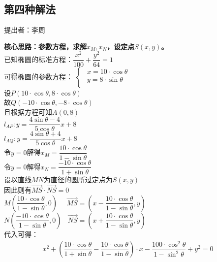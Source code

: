 \documentclass[UTF8]{ctexart}
\begin{document}
\subsection{第四种解法}
    \begin{center}
        提出者：李周
    \end{center}
    \begin{multicols}{2}
        \small
        \textbf{核心思路：参数方程，求解$x_M,x_N$，设定点$S(x,y)$。}\\[4mm]
        已知椭圆的标准方程：$\dfrac{x^2}{100}+\dfrac{y^2}{64}=1$\\[5mm]
        可得椭圆的参数方程：
        \begin{math}
            \begin{cases}
                ~~x=10\cdot\cos{\theta}\\[1mm]
                ~~y=8\cdot\sin{\theta}\\[1mm]
            \end{cases}
        \end{math}\\[5mm]
        设$P(10\cdot\cos{\theta},8\cdot\cos{\theta})$\\[5mm]
        故$Q(-10\cdot\cos{\theta},-8\cdot\cos{\theta})$\\[5mm]
        且根据方程可知$A(0,8)$\\[5mm]
        $l_{AP}:y=\dfrac{4\sin{\theta}-4}{5\cos{\theta}}x+8$\\[5mm]
        $l_{AQ}:y=\dfrac{4\sin{\theta}+4}{5\cos{\theta}}x+8$\\[5mm]
        令$y=0$解得$x_M=\dfrac{10\cdot\cos{\theta}}{1-\sin{\theta}}$\\[5mm]
        令$y=0$解得$x_N=\dfrac{-10\cdot\cos{\theta}}{1+\sin{\theta}}$\\[10mm]
        设以直线$MN$为直径的圆所过定点为$S(x,y)$\\[3mm]
        因此则有$\overrightarrow{MS}\cdot\overrightarrow{NS}=0$\\[5mm]
        $M\left(\dfrac{10\cdot\cos{\theta}}{1-\sin{\theta}},0\right)~~~~~~\overrightarrow{MS}=\left(x-\dfrac{10\cdot\cos{\theta}}{1-\sin{\theta}},y\right)$\\[5mm]
        $N\left(\dfrac{-10\cdot\cos{\theta}}{1-\sin{\theta}},0\right)~~~~\overrightarrow{NS}=\left(x+\dfrac{10\cdot\cos{\theta}}{1-\sin{\theta}},y\right)$\\[60mm]
        代入可得：
        \begin{align*}
            x^2+\left(\dfrac{10\cdot\cos{\theta}}{1+\sin{\theta}}-\dfrac{10\cdot\cos{\theta}}{1-\sin{\theta}}\right)\cdot x-\dfrac{100\cdot\cos^2{\theta}}{1-\sin^2{\theta}}+y^2=0   

\end{align*}
\end{multicols}
\end{document}
